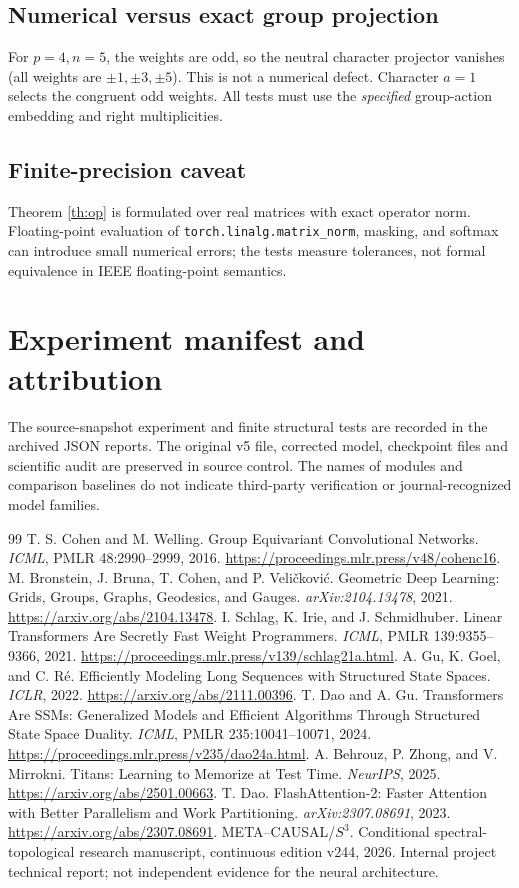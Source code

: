 \documentclass[11pt,a4paper]{article}
\theoremstyle{plain}\newtheorem{theorem}{Theorem}[section]\newtheorem{proposition}[theorem]{Proposition}\newtheorem{lemma}[theorem]{Lemma}
\theoremstyle{definition}\newtheorem{definition}[theorem]{Definition}\newtheorem{remark}[theorem]{Remark}\newtheorem{counterexample}[theorem]{Counterexample}
\begin{document}
\subsection{Numerical versus exact group projection}
For $p=4,n=5$, the weights are odd, so the neutral character projector vanishes (all weights are $\pm1,\pm3,\pm5$). This is not a numerical defect. Character $a=1$ selects the congruent odd weights. All tests must use the \emph{specified} group-action embedding and right multiplicities.
\subsection{Finite-precision caveat}
Theorem \ref{th:op} is formulated over real matrices with exact operator norm. Floating-point evaluation of \verb|torch.linalg.matrix_norm|, masking, and softmax can introduce small numerical errors; the tests measure tolerances, not formal equivalence in IEEE floating-point semantics.

\section{Experiment manifest and attribution}
The source-snapshot experiment and finite structural tests are recorded in the archived JSON reports. The original v5 file, corrected model, checkpoint files and scientific audit are preserved in source control.
The names of modules and comparison baselines do not indicate third-party verification or journal-recognized model families.

\begin{thebibliography}{99}
 T. S. Cohen and M. Welling. Group Equivariant Convolutional Networks. \emph{ICML}, PMLR 48:2990--2999, 2016. \url{https://proceedings.mlr.press/v48/cohenc16}.
 M. Bronstein, J. Bruna, T. Cohen, and P. Veli\v{c}kovi\'c. Geometric Deep Learning: Grids, Groups, Graphs, Geodesics, and Gauges. \emph{arXiv:2104.13478}, 2021. \url{https://arxiv.org/abs/2104.13478}.
 I. Schlag, K. Irie, and J. Schmidhuber. Linear Transformers Are Secretly Fast Weight Programmers. \emph{ICML}, PMLR 139:9355--9366, 2021. \url{https://proceedings.mlr.press/v139/schlag21a.html}.
 A. Gu, K. Goel, and C. R\'e. Efficiently Modeling Long Sequences with Structured State Spaces. \emph{ICLR}, 2022. \url{https://arxiv.org/abs/2111.00396}.
 T. Dao and A. Gu. Transformers Are SSMs: Generalized Models and Efficient Algorithms Through Structured State Space Duality. \emph{ICML}, PMLR 235:10041--10071, 2024. \url{https://proceedings.mlr.press/v235/dao24a.html}.
 A. Behrouz, P. Zhong, and V. Mirrokni. Titans: Learning to Memorize at Test Time. \emph{NeurIPS}, 2025. \url{https://arxiv.org/abs/2501.00663}.
 T. Dao. FlashAttention-2: Faster Attention with Better Parallelism and Work Partitioning. \emph{arXiv:2307.08691}, 2023. \url{https://arxiv.org/abs/2307.08691}.
 META--CAUSAL/$S^3$. Conditional spectral-topological research manuscript, continuous edition v244, 2026. Internal project technical report; not independent evidence for the neural architecture.
\end{thebibliography}
\end{document}
